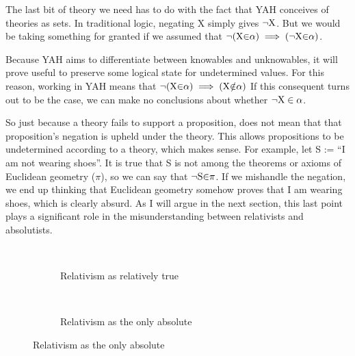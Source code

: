 \documentclass[12pt]{article}
\begin{document}
\begin{flushleft}
The last bit of theory we need has to do with the fact that YAH conceives of theories as sets.
In traditional logic, negating X simply gives ${\neg}\textnormal{X}$.
But we would be taking something for granted if we assumed that ${\neg}(\textnormal{X}{\in} \alpha) \implies ({\neg}\textnormal{X}{\in} \alpha)$.

Because YAH aims to differentiate between knowables and unknowables, it will prove useful to preserve some logical state for undetermined values.
For this reason, working in YAH means that ${\neg}(\textnormal{X}{\in} \alpha) \implies (\textnormal{X}{\notin} \alpha)$
If this consequent turns out to be the case, we can make no conclusions about whether ${\neg}\textnormal{X} \in \alpha$.

So just because a theory fails to support a proposition, does not mean that that proposition's negation is upheld under the theory.
This allows propositions to be undetermined according to a theory, which makes sense.
For example, let S :=  ``I am not wearing shoes''.
It is true that S is not among the theorems or axioms of Euclidean geometry ($\pi$), so we can say that ${\neg}\textnormal{S}{\in} \pi$.
If we mishandle the negation, we end up thinking that Euclidean geometry somehow proves that I am wearing shoes, which is clearly absurd.
As I will argue in the next section, this last point plays a significant role in the misunderstanding between relativists and absolutists.














\begin{figure}[h]
\begin{subfigure}{.5\textwidth}
    \fitchctx
    {
        \pline{\bigstar}\\
        \subproof
        {
        }
        {
            \subproof
            {
            }
            {
                \pline{}
            }
            \subproof
            {
            }
            {
                \pline{}
            }
        }
        \subproof
        {
        }
        {
            \subproof
            {
            }
            {
                \pline{}
            }
        }
    }
    \caption{Relativism as relatively true}
\end{subfigure}%
\begin{subfigure}{.5\textwidth}
    \fitchprf
    {
    }
    {
        \pline{\bigstar}\\
        \subproof
        {
        }
        {
            \subproof
            {
            }
            {
                \pline{\lfalse}
            }
        }
    }
    \caption{Relativism as the only absolute}
\end{subfigure}
\end{figure}



\end{flushleft}
\end{document}
